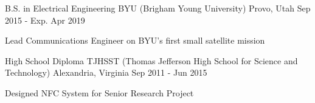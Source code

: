 

\begin{cventries}

  \cventry
  {B.S. in Electrical Engineering} %
  {BYU (Brigham Young University)} %
  {Provo, Utah} %
  {Sep 2015 - Exp. Apr 2019} %
    {
      \begin{cvitems} %
      \item {Lead Communications Engineer on BYU's first small satellite mission}
      \end{cvitems}
    }

  \cventry
  {High School Diploma} %
  {TJHSST (Thomas Jefferson High School for Science and Technology)} %
  {Alexandria, Virginia} %
  {Sep 2011 - Jun 2015} %
    {
      \begin{cvitems} %
      \item {Designed NFC System for Senior Research Project}
      \end{cvitems}
    }

\end{cventries}
